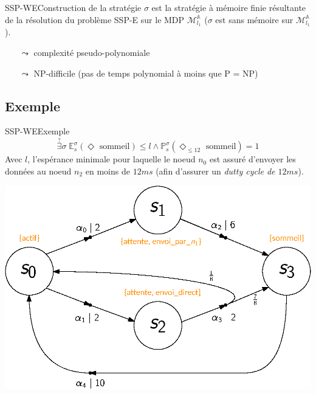 \documentclass[compress]{beamer}
\theoremstyle{theorem}%
\begin{document}
\begin{frame}{SSP-WE}{Construction de la stratégie}
  $\sigma$ est la stratégie à mémoire finie résultante de la résolution du problème SSP-E sur le MDP $\mathcal{M}_{l_1}^\mathbb{A}$ ($\sigma$ est sans mémoire sur $\mathcal{M}_{l_1}^\mathbb{A}$).
  \begin{itemize}
    \item[$\leadsto$] complexité pseudo-polynomiale
    \item[$\leadsto$] NP-difficile (pas de temps polynomial à moins que P = NP)
  \end{itemize}
\end{frame}

\subsection{Exemple}
\begin{frame}{SSP-WE}{Exemple}
    \[ \overset{?}{\exists} \sigma \; \mathbb{E}^{\sigma}_s(\Diamond \text{ sommeil}) \leq l \wedge \mathbb{P}^\sigma_s(\Diamond_{\leq 12} \text{ sommeil}) = 1 \]
    {\footnotesize Avec $l$, l'espérance minimale pour laquelle le noeud $n_0$ est assuré d'envoyer les données au noeud $n_2$ en moins de $12 ms$ (afin d'assurer un \textit{dutty cycle de $12 ms$}).}
    \begin{center}
      \includegraphics[width=0.6\linewidth]{resources/main-mdp3}
    \end{center}
\end{frame}
\end{document}
